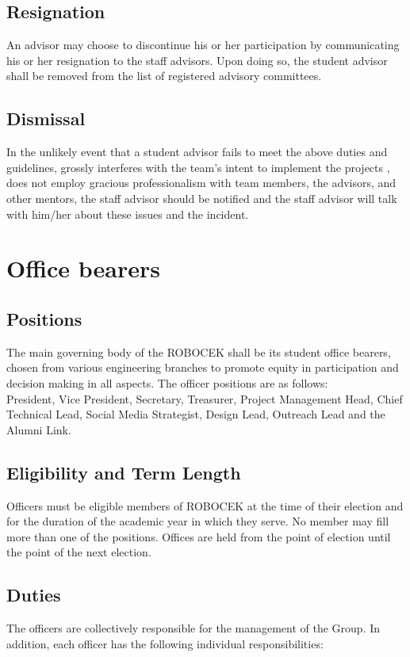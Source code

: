 \subsection{Resignation}
An advisor may choose to discontinue his or her participation by
communicating his or her resignation to the staff advisors. Upon doing so,
the student advisor shall be removed from the list of registered advisory
committees.

\subsection{Dismissal}
In the unlikely event that a student advisor fails to meet the above duties
and guidelines, grossly interferes with the team’s intent to implement the
projects , does not employ gracious professionalism with team members,
the advisors, and other mentors, the staff advisor should be notified and
the staff advisor will talk with him/her about these issues and the incident.

\section{Office bearers}

\subsection{Positions}
The main governing body of the ROBOCEK shall be its student office
bearers, chosen from various engineering branches to promote equity in
participation and decision making in all aspects. The officer positions are
as follows:
\\

President, Vice President, Secretary, Treasurer, Project Management
Head, Chief Technical Lead, Social Media Strategist, Design Lead,
Outreach Lead and the Alumni Link.

\subsection{Eligibility and Term Length}
Officers must be eligible members of ROBOCEK at the time of their
election and for the duration of the academic year in which they serve. No
member may fill more than one of the positions.
Offices are held from the point of election until the point of the next
election.

\subsection{Duties}
The officers are collectively responsible for the management of the Group.
In addition, each officer has the following individual responsibilities:

